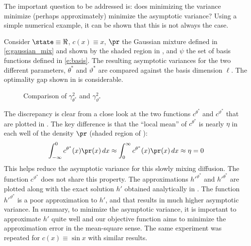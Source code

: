 The important question to be addressed is: does minimizing the variance minimize (perhaps approximately) minimize the asymptotic variance? Using a simple numerical example, it can be shown that this is not always the case.

Consider $\state \equiv \Re$, $c(x) \equiv x $, $\pr$ the Gaussian mixture defined in \eqref{e:gaussian_mix} and shown by the shaded region in ,  and $\psi$  the set of basis functions defined in \eqref{e:basis}.   The resulting asymptotic variances for the two different parameters, $\theta^*$ and $\vartheta^*$ are compared against the basis dimension $\ell$.  The optimality gap shown in
 is considerable.
\begin{figure}
	\caption{Comparison of $\gamma^2_{\theta^*}$ and $\gamma^2_{\vartheta^*}$}
	\label{var_vs_asym_var}
\end{figure}


The discrepancy is clear from a close look at the two functions $c^{\theta^*}$ and $c^{\vartheta^*}$ that are plotted
in .    The key difference is that the ``local mean'' of $c^{\theta^*}$ is nearly $\eta$ in each well of the density $\pr$ (shaded region of ):
\[
\begin{aligned}
\int_{-\infty}^0 c^{\theta^*}(x) \pr(x)\, dx	
\approx
\int_0^\infty c^{\theta^*}(x) \pr(x) \, dx \approx \eta =0
\end{aligned}
\]
This helps reduce the asymptotic variance for this slowly mixing diffusion. The function $c^{\vartheta^*}$  does not share this property.
The approximations $h'^{\vartheta^*}$ and $h'^{\theta^*}$ are plotted along with the exact solution $h'$ obtained analytically in
.  The function $h'^{\vartheta^*}$ is a poor approximation to $h'$,  and that results in much higher asymptotic variance. In summary, to minimize the asymptotic variance, it is  important to approximate $h'$ quite well and our objective function aims to minimize the approximation error in the mean-square sense. The same experiment was repeated for $c(x) \equiv\sin x$ with similar results.



